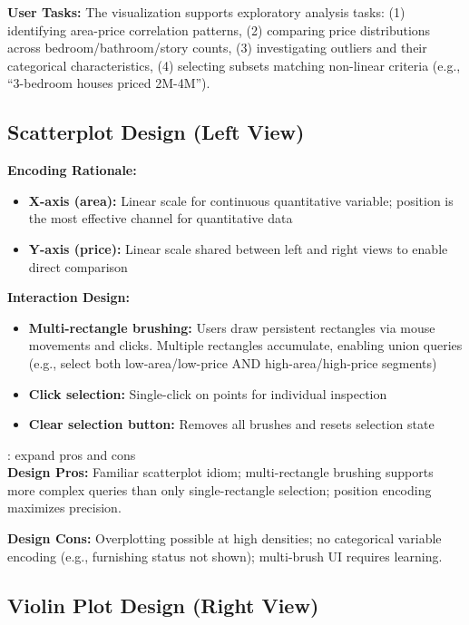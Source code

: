 \documentclass[sigplan,screen]{acmart}
\begin{document}
\textbf{User Tasks:} The visualization supports exploratory analysis
tasks: (1) identifying area-price correlation patterns, (2)
comparing price distributions across bedroom/bathroom/story counts, (3)
investigating outliers and their categorical characteristics, (4)
selecting subsets matching non-linear criteria (e.g., ``3-bedroom houses
priced 2M-4M'').

\subsection{Scatterplot Design (Left View)}

\textbf{Encoding Rationale:}
\begin{itemize}
\item \textbf{X-axis (area):} Linear scale for continuous quantitative
      variable; position is the most effective channel for quantitative
      data
\item \textbf{Y-axis (price):} Linear scale shared between left and
      right views to enable direct comparison
\end{itemize}

\textbf{Interaction Design:}
\begin{itemize}
\item \textbf{Multi-rectangle brushing:} Users draw persistent
      rectangles via mouse movements and clicks. Multiple rectangles
      accumulate, enabling union queries (e.g., select both
      low-area/low-price AND high-area/high-price segments)
\item \textbf{Click selection:} Single-click on points for individual
      inspection
\item \textbf{Clear selection button:} Removes all brushes and resets selection
      state
\end{itemize}

\TODO: expand pros and cons
\\
\textbf{Design Pros:} Familiar scatterplot idiom; multi-rectangle brushing
supports more complex queries than only single-rectangle selection; 
position encoding maximizes precision.

\textbf{Design Cons:} Overplotting possible at high densities; no categorical
variable encoding (e.g., furnishing status not shown); multi-brush UI
requires learning.

\subsection{Violin Plot Design (Right View)}
\end{document}
